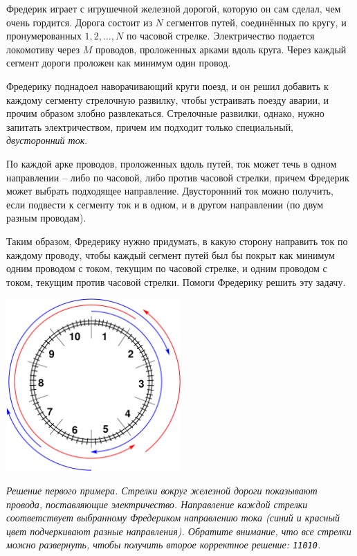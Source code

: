 \ifx\boi\undefined\fi
\def\version{jury-1}
Фредерик играет с игрушечной железной дорогой, которую он сам сделал, чем очень гордится.
Дорога состоит из $N$ сегментов путей, соединённых по кругу, и пронумерованных $1, 2, \dots, N$ по часовой стрелке.
Электричество подается локомотиву через $M$ проводов, проложенных арками вдоль круга. Через каждый сегмент дороги проложен как минимум один провод.

Фредерику поднадоел наворачивающий круги поезд, и он решил добавить к каждому сегменту стрелочную развилку, чтобы устраивать поезду аварии, и прочим образом злобно развлекаться.
Стрелочные развилки, однако, нужно запитать электричеством, причем им подходит только специальный, \emph{двусторонний ток}.

По каждой арке проводов, проложенных вдоль путей, ток может течь в одном направлении -- либо по часовой, либо против часовой стрелки, причем Фредерик может выбрать подходящее направление.
Двусторонний ток можно получить, если подвести к сегменту ток и в одном, и в другом направлении (по двум разным проводам).

Таким образом, Фредерику нужно придумать, в какую сторону направить ток по каждому проводу, чтобы каждый сегмент путей был бы покрыт как минимум одним проводом с током, текущим по часовой стрелке, 
и одним проводом с током, текущим против часовой стрелки. Помоги Фредерику решить эту задачу.

\vspace{2mm}
\begin{center}
\includegraphics[width=0.5\textwidth]{alternatingfig.pdf}
\end{center}
\vspace{1mm}
{\em Решение первого примера. Стрелки вокруг железной дороги показывают провода, поставляющие электричество. Направление каждой стрелки соответствует выбранному Фредериком направлению тока (синий и красный цвет подчеркивают разные направления). Обратите внимание, что все стрелки можно развернуть, чтобы получить второе корректное решение: \texttt{11010}.}

